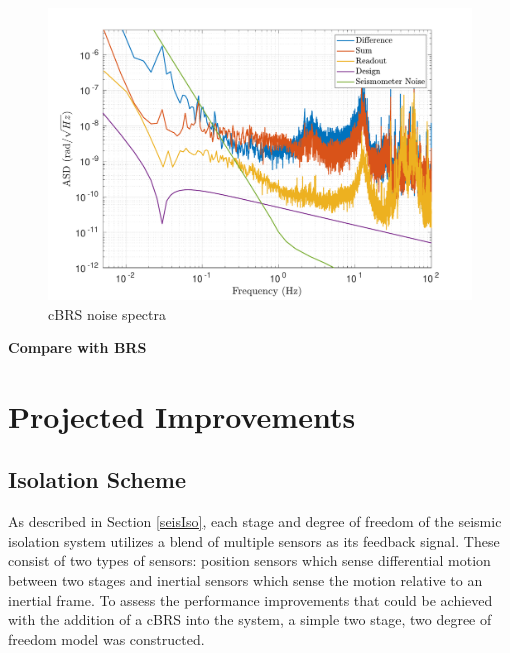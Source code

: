 \documentclass [12pt, proquest]{uwthesis}[2019]
\begin{document}
\begin{figure}
\begin{center}
 \includegraphics[width=\textwidth]{cBRS_Noise.pdf}
\caption[cBRS noise spectra]{cBRS noise spectra}
\label{cBRS_noise}
\end{center}
\end{figure}

\textbf{Compare with BRS}

\section{Projected Improvements}
\subsection{Isolation Scheme} \label{IsoScheme}

As described in Section \ref{seisIso}, each stage and degree of freedom of the seismic isolation system utilizes a blend of multiple sensors as its feedback signal. These consist of two types of sensors: position sensors which sense differential motion between two stages and inertial sensors which sense the motion relative to an inertial frame. To assess the performance improvements that could be achieved with the addition of a cBRS into the system, a simple two stage, two degree of freedom model was constructed. 
\end{document}
